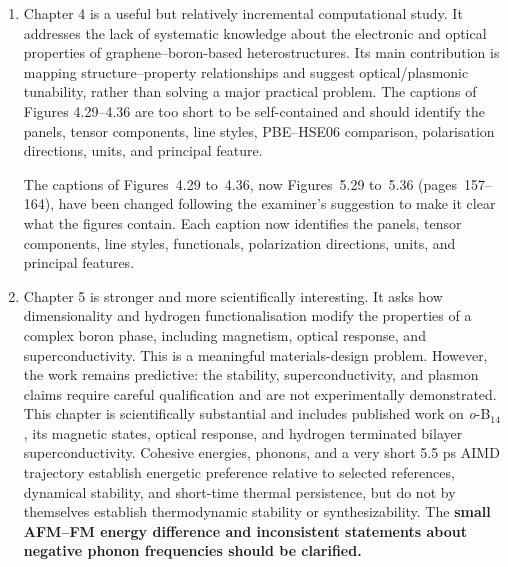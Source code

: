 \documentclass[12pt,a4paper]{article}
\newenvironment{reply}{\par\medskip\color{replyblue}}{\par\medskip}
\begin{document}
\begin{enumerate}[leftmargin=*]
\begin{reply}
Chapters~2 and~3 have been considerably shortened as noted above.
Following the examiner's suggestion, a description of the density functional theory codes and of the calculations used in the thesis is now given in Section~2.4 (pages~62--72).
It covers the methods listed by the examiner, apart from spin-orbit coupling and the topological analysis, which are described in Chapter~4 (pages~97--114).
Each method is connected to its use in the research chapters.
Since each system studied requires different k-points and energy cutoffs, these details are still provided in the related chapters.
\end{reply}

\item Chapter 4 is a useful but relatively incremental computational study. It addresses the lack of systematic knowledge about the electronic and optical properties of graphene--boron-based heterostructures. Its main contribution is mapping structure--property relationships and suggest optical/plasmonic tunability, rather than solving a major practical problem. The captions of Figures 4.29--4.36 are too short to be self-contained and should identify the panels, tensor components, line styles, PBE--HSE06 comparison, polarisation directions, units, and principal feature.

\begin{reply}
The captions of Figures~4.29 to~4.36, now Figures~5.29 to~5.36 (pages~157--164), have been changed following the examiner's suggestion to make it clear what the figures contain.
Each caption now identifies the panels, tensor components, line styles, functionals, polarization directions, units, and principal features.
\end{reply}

\item Chapter 5 is stronger and more scientifically interesting. It asks how dimensionality and hydrogen functionalisation modify the properties of a complex boron phase, including magnetism, optical response, and superconductivity. This is a meaningful materials-design problem. However, the work remains predictive: the stability, superconductivity, and plasmon claims require careful qualification and are not experimentally demonstrated. This chapter is scientifically substantial and includes published work on \textit{o}-B$_{14}$, its magnetic states, optical response, and hydrogen terminated bilayer superconductivity. Cohesive energies, phonons, and a very short 5.5 ps AIMD trajectory establish energetic preference relative to selected references, dynamical stability, and short-time thermal persistence, but do not by themselves establish thermodynamic stability or synthesizability. The \textbf{small AFM--FM energy difference and inconsistent statements about negative phonon frequencies should be clarified.}


\end{enumerate}
\end{document}

